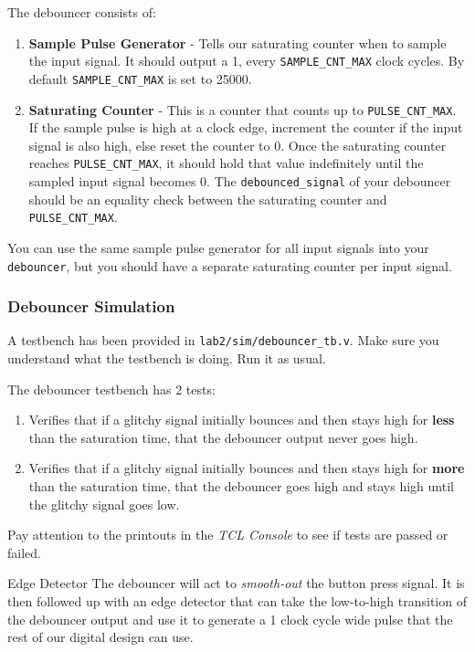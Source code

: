 \documentclass[11pt]{article}
\makeatletter
\renewcommand{\subsection}
{\@startsection {subsection}{1}{0pt}
 {-1ex}
 {0.5ex}
 {\bfseries\normalsize}}
\makeatother
\begin{document}
The debouncer consists of:
\begin{enumerate}
  \item \textbf{Sample Pulse Generator} - Tells our saturating counter when to sample the input signal. It should output a 1, every \verb|SAMPLE_CNT_MAX| clock cycles. By default \verb|SAMPLE_CNT_MAX| is set to 25000.
  \item \textbf{Saturating Counter} - This is a counter that counts up to \verb|PULSE_CNT_MAX|.
    If the sample pulse is high at a clock edge, increment the counter if the input signal is also high, else reset the counter to 0.
    Once the saturating counter reaches \verb|PULSE_CNT_MAX|, it should hold that value indefinitely until the sampled input signal becomes 0.
    The \verb|debounced_signal| of your debouncer should be an equality check between the saturating counter and \verb|PULSE_CNT_MAX|.
\end{enumerate}

You can use the same sample pulse generator for all input signals into your \verb|debouncer|, but you should have a separate saturating counter per input signal.

\subsubsection{Debouncer Simulation}
A testbench has been provided in \verb|lab2/sim/debouncer_tb.v|. Make sure you understand what the testbench is doing. Run it as usual.

The debouncer testbench has 2 tests:
\begin{enumerate}
  \item Verifies that if a glitchy signal initially bounces and then stays high for \textbf{less} than the saturation time, that the debouncer output never goes high.
  \item Verifies that if a glitchy signal initially bounces and then stays high for \textbf{more} than the saturation time, that the debouncer goes high and stays high until the glitchy signal goes low.
\end{enumerate}

Pay attention to the printouts in the \emph{TCL Console} to see if tests are passed or failed.

\subsection{Edge Detector}
The debouncer will act to \emph{smooth-out} the button press signal.
It is then followed up with an edge detector that can take the low-to-high transition of the debouncer output and use it to generate a 1 clock cycle wide pulse that the rest of our digital design can use.
\end{document}
